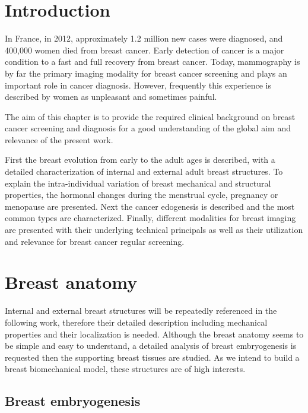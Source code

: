 \section{Introduction}\label{section:background:introduction}

In France, in 2012, approximately 1.2 million new cases were diagnosed, and 400,000 women died from breast cancer. Early detection of cancer is a major condition to a fast and full recovery from breast cancer. Today, mammography is by far the primary imaging modality for breast cancer screening and plays an important role in cancer diagnosis. However, frequently this experience is described by women as unpleasant and sometimes painful.

The aim of this chapter is to provide the required clinical background on breast cancer screening and diagnosis for a good understanding of the global aim and relevance of the present work. 

First the breast evolution from early to the adult ages is described, with a detailed characterization of internal and external adult breast structures. To explain the intra-individual variation of breast mechanical and structural properties, the hormonal changes during the menstrual cycle, pregnancy or menopause are presented.   Next the cancer edogenesis is described and the most common types are characterized. Finally, different modalities for breast imaging are presented with their underlying technical principals as well as their utilization and relevance for breast cancer regular screening.

\clearpage
\section{Breast anatomy}\label{section:breastanatomy}

Internal and external breast structures will be repeatedly referenced in the following work, therefore their detailed description including mechanical properties and their localization is needed. Although the breast anatomy seems to be simple and easy to understand, a detailed analysis of breast embryogenesis is requested then the supporting breast tissues are studied. As we intend to build a breast biomechanical model, these structures are of high interests.  

  
\subsection{Breast embryogenesis}\label{subsection:breastembryogenesis}

